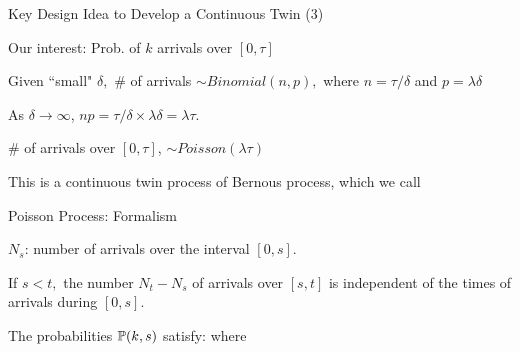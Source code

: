 \documentclass[fleqn,aspectratio=169]{beamer}
\begin{document}
\begin{frame}{Key Design Idea to Develop a Continuous Twin (3)}

\begin{center}
\end{center}
\vspace{-0.8cm}
\plitemsep 0.1in
\bci
\item<1-> Our interest: Prob. of $k$ arrivals over $[0,\tau]$

\item<2-> Given ``small" $\delta,$ \# of arrivals $\sim Binomial(n,p),$ where $n = \tau/\delta$ and $p =\lambda \delta$

\item<3-> As $\delta \rightarrow \infty$, $np = \tau/\delta \times \lambda \delta = \lambda \tau.$

\item<4-> \# of arrivals over $[0,\tau]$, $\sim Poisson(\lambda \tau)$

\item<5-> This is a continuous twin process of Bernous process, which we call 

\eci
\end{frame}


\begin{frame}{Poisson Process: Formalism}

\plitemsep 0.1in
\bci
\item<2-> $N_s$: number of arrivals over the interval $[0,s].$

\item<3->  If $s < t,$ the number $N_t - N_s$ of arrivals over $[s,t]$ is independent of the times of arrivals during $[0,s].$


\item<5->  The probabilities $\mathbb{P}( k,s )$ satisfy:
where 

\eci
\end{frame}
\end{document}
